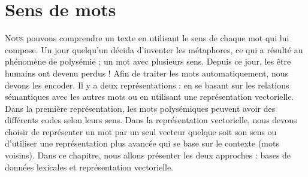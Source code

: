 \documentclass{KodeBook}
\begin{document}
		\mainmatter
	
\fi
\chapter{Sens de mots}

\begin{introduction}
	\lettrine{N}{ous} pouvons comprendre un texte en utilisant le sens de chaque mot qui lui compose. 
	Un jour quelqu'un décida d'inventer les métaphores, ce qui a résulté au phénomène de polysémie ; un mot avec plusieurs sens. 
	Depuis ce jour, les être humains ont devenu perdus ! 
	Afin de traiter les mots automatiquement, nous devons les encoder.
	Il y a deux représentations : en se basant sur les relations sémantiques avec les autres mots ou en utilisant une représentation vectorielle. 
	Dans la première représentation, les mots polysémiques peuvent avoir des différents codes selon leurs sens. 
	Dans la représentation vectorielle, nous devons choisir de représenter un mot par un seul vecteur quelque soit son sens ou d'utiliser une représentation plus avancée qui se base sur le contexte (mots voisins).
	Dans ce chapitre, nous allons présenter les deux approches : bases de données lexicales et représentation vectorielle.
\end{introduction} 
\end{document}
